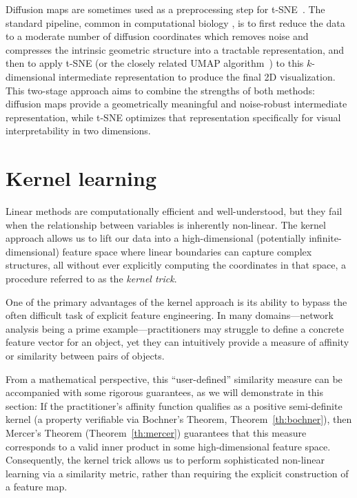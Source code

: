 Diffusion maps are sometimes used as a preprocessing step  for t-SNE~\cite{wolf2018scanpy,moon2019visualizing,haghverdi2015diffusion}. The standard pipeline, common in computational biology \cite{wolf2018scanpy}, is to first reduce the data to a moderate number of diffusion coordinates which removes noise and compresses the intrinsic geometric structure into a tractable representation, and then to apply t-SNE (or the closely related UMAP algorithm~\cite{mcinnes2018umap}) to this 
$k$-dimensional intermediate representation to produce the final 2D visualization. This two-stage approach aims to combine the strengths of both methods: diffusion maps provide a geometrically meaningful and noise-robust intermediate representation, while t-SNE  optimizes that representation specifically for visual interpretability in two dimensions.

\section{Kernel learning}\label{s:kernellearning}

Linear methods are computationally efficient and well-understood, but they fail when the relationship between variables is inherently non-linear. The kernel approach allows us to lift our data into a high-dimensional (potentially infinite-dimensional) feature space where linear boundaries can capture complex structures, all without ever explicitly computing the coordinates in that space, a procedure referred to as the {\em kernel trick}. 

One of the primary advantages of the kernel approach is its ability to bypass the often difficult task of explicit feature engineering. In many domains---network analysis being a prime example---practitioners may struggle to define a concrete feature vector for an object, yet they can intuitively provide a measure of affinity or similarity between pairs of objects.

From a mathematical perspective, this ``user-defined'' similarity measure can be accompanied with some rigorous guarantees, as we will demonstrate in this section: If the practitioner's affinity function qualifies as a positive semi-definite  kernel (a property verifiable via Bochner’s Theorem, Theorem~\ref{th:bochner}), then Mercer’s Theorem (Theorem~\ref{th:mercer}) guarantees that this measure corresponds to a valid inner product in some high-dimensional feature space. Consequently, the kernel trick allows us to perform sophisticated non-linear learning via a similarity metric, rather than requiring the explicit construction of a feature map.

